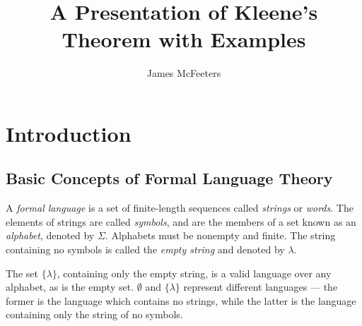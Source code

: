 \documentclass{bcthesis}
\title{A Presentation of Kleene's Theorem with Examples}
\author{James McFeeters}
\newif\ifbuildfrontmatter
\newcommand{\footcite}[2]{\footnote{\cite[pg.~{#2}]{#1}}}
\renewcommand{\footcite}[2]{\cite[pg.~{#2}]{#1}}
\begin{document}
\ifbuildfrontmatter
\frontmatter

	\maketitle

	\begin{abstract}
		Your abstract goes here.
	\end{abstract}


	\begin{acknowledgments}
		Here you should acknowledge any special help on your project, or particular influences on your life or mathematical development.
	\end{acknowledgments}

	\tableofcontents
\fi

\mainmatter

\chapter{Introduction}%
\label{ch:introduction}

	\section{Basic Concepts of Formal Language Theory} %
	\label{sec:basic_concepts}

		A \textit{formal language} is a set of finite-length sequences called \textit{strings} or \textit{words}.
		The elements of strings are called \textit{symbols}, and are the members of a set known as an \textit{alphabet}, denoted by $\Sigma$.
		Alphabets must be nonempty and finite.
		The string containing no symbols is called the \textit{empty string} and denoted by $\lambda$.\footcite{lemmings}{1--3}

		The set $\{ \lambda \}$, containing only the empty string, is a valid language over any alphabet, as is the empty set.
		$\emptyset$ and $\{ \lambda \}$ represent different languages --- the former is the language which contains no strings, while the latter is the language containing only the string of no symbols.\footcite{hopcroft}{2}
\end{document}

